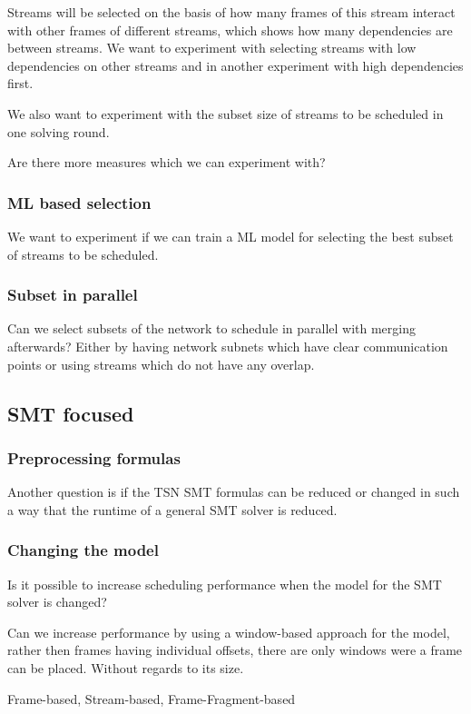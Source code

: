 \documentclass{article}
\begin{document}
Streams will be selected on the basis of how many frames of this stream interact with other frames of different streams, which shows how many dependencies are between streams. We want to experiment with selecting streams with low dependencies on other streams and in another experiment with high dependencies first.

We also want to experiment with the subset size of streams to be scheduled in one solving round.

Are there more measures which we can experiment with?

\subsubsection{ML based selection}
We want to experiment if we can train a ML model for selecting the best subset of streams to be scheduled.

\subsubsection{Subset in parallel}
Can we select subsets of the network to schedule in parallel with merging afterwards? Either by having network subnets which have clear communication points or using streams which do not have any overlap.

\subsection{SMT focused}
\subsubsection{Preprocessing formulas}
Another question is if the TSN SMT formulas can be reduced or changed in such a way that the runtime of a general SMT solver is reduced.

\subsubsection{Changing the model}
Is it possible to increase scheduling performance when the model for the SMT solver is changed?

Can we increase performance by using a window-based approach for the model, rather then frames having individual offsets, there are only windows were a frame can be placed. Without regards to its size.

Frame-based, Stream-based, Frame-Fragment-based



\end{document}

